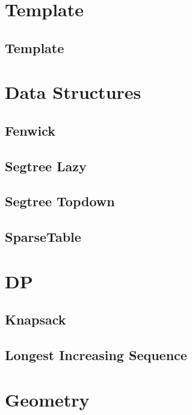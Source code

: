 \section{Template}
\subsection{Template}
\raggedbottom
\hrulefill

\section{Data Structures}
\subsection{Fenwick}
\raggedbottom
\hrulefill
\subsection{Segtree Lazy}
\raggedbottom
\hrulefill
\subsection{Segtree Topdown}
\raggedbottom
\hrulefill
\subsection{SparseTable}
\raggedbottom
\hrulefill

\section{DP}
\subsection{Knapsack}
\raggedbottom
\hrulefill
\subsection{Longest Increasing Sequence}
\raggedbottom
\hrulefill

\section{Geometry}
